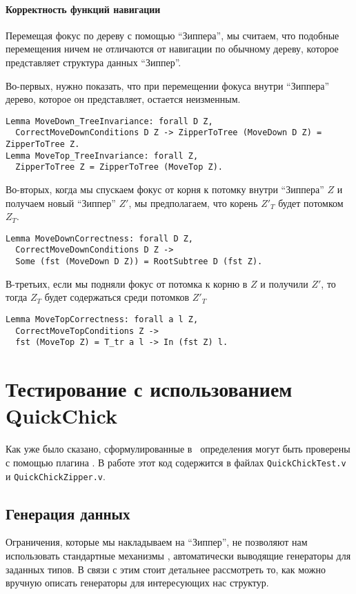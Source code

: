 \paragraph{Корректность функций навигации}

Перемещая фокус по дереву с помощью ``Зиппера'', мы считаем, что подобные перемещения ничем не отличаются от навигации по обычному дереву, которое представляет структура данных ``Зиппер''.

Во-первых, нужно показать, что при перемещении фокуса внутри ``Зиппера'' дерево, которое он представляет, остается неизменным.

\begin{lstlisting}
Lemma MoveDown_TreeInvariance: forall D Z,
  CorrectMoveDownConditions D Z -> ZipperToTree (MoveDown D Z) = ZipperToTree Z.
Lemma MoveTop_TreeInvariance: forall Z,
  ZipperToTree Z = ZipperToTree (MoveTop Z).
\end{lstlisting}

Во-вторых, когда мы спускаем фокус от корня к потомку внутри ``Зиппера'' $Z$ и получаем новый ``Зиппер'' $Z'$, мы предполагаем, что корень $Z'_T$ будет потомком $Z_T$.  
\begin{lstlisting}
Lemma MoveDownCorrectness: forall D Z,
  CorrectMoveDownConditions D Z ->
  Some (fst (MoveDown D Z)) = RootSubtree D (fst Z).
\end{lstlisting}

В-третьих, если мы подняли фокус от потомка к корню в $Z$ и получили $Z'$, то тогда $Z_T$ будет содержаться среди потомков $Z'_T$
\begin{lstlisting}
Lemma MoveTopCorrectness: forall a l Z,
  CorrectMoveTopConditions Z ->
  fst (MoveTop Z) = T_tr a l -> In (fst Z) l.
\end{lstlisting}

\section{Тестирование с использованием QuickChick}

Как уже было сказано, сформулированные в \tcoq~определения могут быть проверены с помощью плагина \tqc. В работе этот код содержится в файлах \texttt{QuickChickTest.v} и \texttt{QuickChickZipper.v}.

\subsection{Генерация данных}

Ограничения, которые мы накладываем на ``Зиппер'', не позволяют нам использовать стандартные механизмы \tqc, автоматически выводящие генераторы для заданных типов. В связи с этим стоит детальнее рассмотреть то, как можно вручную описать генераторы для интересующих нас структур.

